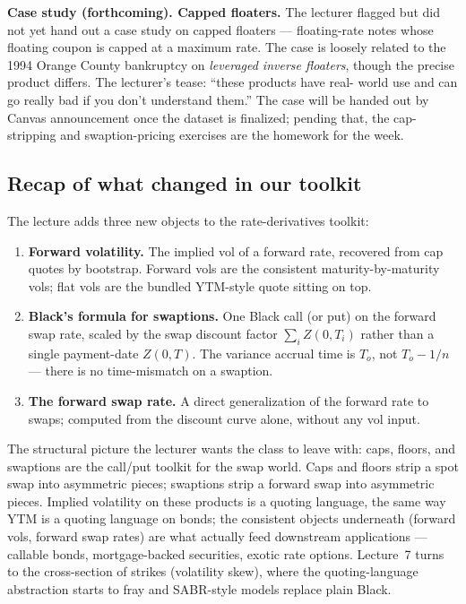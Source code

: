 \begin{exerciseblock}
\textbf{Case study (forthcoming). Capped floaters.} The lecturer
flagged but did not yet hand out a case study on capped floaters ---
floating-rate notes whose floating coupon is capped at a maximum
rate. The case is loosely related to the 1994 Orange County
bankruptcy on \emph{leveraged inverse floaters}, though the precise
product differs. The lecturer's tease: ``these products have real-
world use and can go really bad if you don't understand them.'' The
case will be handed out by Canvas announcement once the dataset is
finalized; pending that, the cap-stripping and swaption-pricing
exercises are the homework for the week.
\end{exerciseblock}

\subsection{Recap of what changed in our toolkit}\label{L6-sec:recap}

The lecture adds three new objects to the rate-derivatives toolkit:

\begin{enumerate}[label=(\arabic*)]
  \item \textbf{Forward volatility.} The implied vol of a forward
        rate, recovered from cap quotes by bootstrap. Forward vols are
        the consistent maturity-by-maturity vols; flat vols are the
        bundled YTM-style quote sitting on top.
  \item \textbf{Black's formula for swaptions.} One Black call (or
        put) on the forward swap rate, scaled by the swap discount
        factor $\sum_i Z(0, T_i)$ rather than a single payment-date
        $Z(0, T)$. The variance accrual time is $T_o$, not
        $T_o - 1/n$ --- there is no time-mismatch on a swaption.
  \item \textbf{The forward swap rate.} A direct generalization of
        the forward rate to swaps; computed from the discount curve
        alone, without any vol input.
\end{enumerate}

The structural picture the lecturer wants the class to leave with:
caps, floors, and swaptions are the call/put toolkit for the swap
world. Caps and floors strip a spot swap into asymmetric pieces;
swaptions strip a forward swap into asymmetric pieces. Implied
volatility on these products is a quoting language, the same way YTM
is a quoting language on bonds; the consistent objects underneath
(forward vols, forward swap rates) are what actually feed downstream
applications --- callable bonds, mortgage-backed securities, exotic
rate options. Lecture~7 turns to the cross-section of strikes
(volatility skew), where the quoting-language abstraction starts to
fray and SABR-style models replace plain Black.
